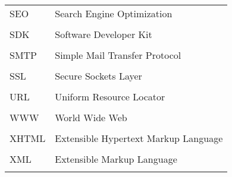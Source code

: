 \begin{tabular}{p{3cm}p{11cm}}

SEO & Search Engine Optimization \\
\\
SDK & Software Developer Kit \\
\\
SMTP & Simple Mail Transfer Protocol \\
\\
SSL & Secure Sockets Layer \\
\\
URL & Uniform Resource Locator \\
\\
WWW & World Wide Web \\
\\
XHTML & Extensible Hypertext Markup Language \\
\\
XML & Extensible Markup Language \\
\\
\end{tabular}


